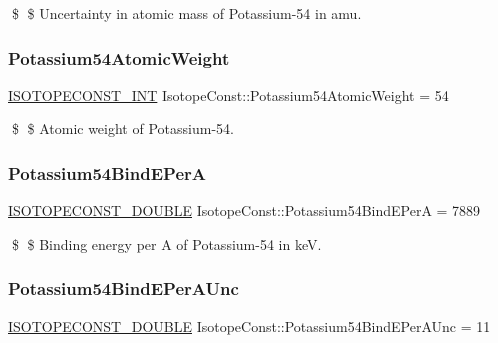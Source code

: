 \$ \$ Uncertainty in atomic mass of Potassium-\/54 in amu. \mbox{\label{group___isotope_const-_potassium-_k54_gabf514de64e4896fe0640e4376d3113cf}} 
\subsubsection{\texorpdfstring{Potassium54\+Atomic\+Weight}{Potassium54AtomicWeight}}
{\footnotesize\ttfamily \mbox{\hyperlink{group___isotope_const-_macros_ga5f18360b3e99483a35c32d789e62621c}{I\+S\+O\+T\+O\+P\+E\+C\+O\+N\+S\+T\+\_\+\+I\+NT}} Isotope\+Const\+::\+Potassium54\+Atomic\+Weight = 54}

\$ \$ Atomic weight of Potassium-\/54. \mbox{\label{group___isotope_const-_potassium-_k54_ga237e481cd27bdddff5c8c3ed5baf7ddb}} 
\subsubsection{\texorpdfstring{Potassium54\+Bind\+E\+PerA}{Potassium54BindEPerA}}
{\footnotesize\ttfamily \mbox{\hyperlink{group___isotope_const-_macros_ga8f45a7272ce02c0b4c65c44636ed719a}{I\+S\+O\+T\+O\+P\+E\+C\+O\+N\+S\+T\+\_\+\+D\+O\+U\+B\+LE}} Isotope\+Const\+::\+Potassium54\+Bind\+E\+PerA = 7889}

\$ \$ Binding energy per A of Potassium-\/54 in keV. \mbox{\label{group___isotope_const-_potassium-_k54_ga21b2c4fd7fca8ad5212536413dbac67d}} 
\subsubsection{\texorpdfstring{Potassium54\+Bind\+E\+Per\+A\+Unc}{Potassium54BindEPerAUnc}}
{\footnotesize\ttfamily \mbox{\hyperlink{group___isotope_const-_macros_ga8f45a7272ce02c0b4c65c44636ed719a}{I\+S\+O\+T\+O\+P\+E\+C\+O\+N\+S\+T\+\_\+\+D\+O\+U\+B\+LE}} Isotope\+Const\+::\+Potassium54\+Bind\+E\+Per\+A\+Unc = 11}

